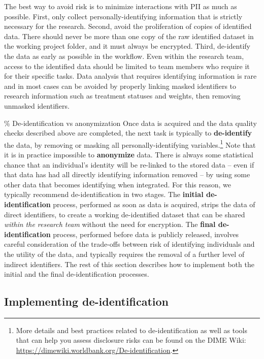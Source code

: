 \documentclass[
]{book}
\begin{document}
The best way to avoid risk is to minimize interactions with PII as much as possible.
First, only collect personally-identifying information that is strictly necessary for the research.
Second, avoid the proliferation of copies of identified data.
There should never be more than one copy of the raw identified dataset in the working project folder,
and it must always be encrypted.
Third, de-identify the data as early as possible in the workflow.
Even within the research team,
access to the identified data should be limited to team members who require it for their specific tasks.
Data analysis that requires identifying information is rare
and in most cases can be avoided by properly linking masked identifiers to research information
such as treatment statuses and weights, then removing unmasked identifiers.

\% De-identification vs anonymization
Once data is acquired and the data quality checks described above are completed,
the next task is typically to \textbf{de-identify} the data,
by removing or masking all personally-identifying variables.\footnote{More details and best practices related to de-identification
  as well as tools that can help you assess disclosure risks
  can be found on the DIME Wiki:
  \url{https://dimewiki.worldbank.org/De-identification}.}
Note that it is in practice impossible to \textbf{anonymize} data.
There is always some statistical chance that an individual's identity
will be re-linked to the stored data
-- even if that data has had all directly identifying information removed --
by using some other data that becomes identifying when integrated.
For this reason, we typically recommend de-identification in two stages.
The \textbf{initial de-identification} process,
performed as soon as data is acquired, strips the data of direct identifiers,
to create a working de-identified dataset that
can be shared \emph{within the research team} without the need for encryption.
The \textbf{final de-identification} process,
performed before data is publicly released, involves
careful consideration of the trade-offs between
risk of identifying individuals and the utility of the data,
and typically requires the removal of a further level of indirect identifiers.
The rest of this section describes how to implement
both the initial and the final de-identification processes.

\hypertarget{implementing-de-identification}{%
\subsection*{Implementing de-identification}\label{implementing-de-identification}}
\end{document}
